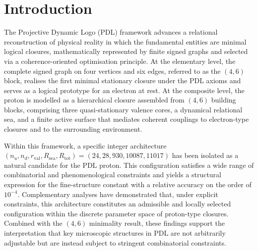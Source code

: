 \documentclass[11pt,a4paper]{article}
\theoremstyle{definition}
\newcommand{\PDL}{\mathrm{PDL}}
\begin{document}
\begin{abstract}
On this basis, we formulate a schematic scaling ansatz in which an effective gravitational coupling $G_{\mathrm{eff}}^{\PDL}$ depends on $\varepsilon$ via an exponent close to $18$, and we articulate qualitative constraints that any such dependence must satisfy in order to remain compatible with both the internal consistency of PDL and empirical phenomenology.\cite{Exponent_18_PDL_2026,Effective_Fields_PDL_2026,PDL_Global_Mapping_2026} Although we do not claim to derive the full gravitational field equations from PDL, the present analysis clarifies the interpretation of coherence leakage as a combinatorial invariant, systematises the hierarchical filtering structure, and outlines a research programme for evaluating the robustness and physical relevance of the exponent $18$.
\end{abstract}

\section{Introduction}

The Projective Dynamic Logo (PDL) framework advances a relational reconstruction of physical reality in which the fundamental entities are minimal logical closures, mathematically represented by finite signed graphs and selected via a coherence-oriented optimisation principle.\cite{PDL_Intro_2026,PDL_Main_2026,PDL_French_2026,PDL_Global_Mapping_2026} At the elementary level, the complete signed graph on four vertices and six edges, referred to as the $(4,6)$ block, realises the first minimal stationary closure under the PDL axioms and serves as a logical prototype for an electron at rest.\cite{PDL_Main_2026} At the composite level, the proton is modelled as a hierarchical closure assembled from $(4,6)$ building blocks, comprising three quasi-stationary valence cores, a dynamical relational sea, and a finite active surface that mediates coherent couplings to electron-type closures and to the surrounding environment.\cite{PDL_Main_2026,Combinatorial_Proton_v2_2026}

Within this framework, a specific integer architecture $(n_u,n_d,r_{\mathrm{val}},R_{\mathrm{sea}},R_{\mathrm{tot}})=(24,28,930,10087,11017)$ has been isolated as a natural candidate for the PDL proton. This configuration satisfies a wide range of combinatorial and phenomenological constraints and yields a structural expression for the fine-structure constant with a relative accuracy on the order of $10^{-4}$.\cite{Combinatorial_Proton_v2_2026,Alpha_PDL_v2_2026,PDL_Global_Mapping_2026} Complementary analyses have demonstrated that, under explicit constraints, this architecture constitutes an admissible and locally selected configuration within the discrete parameter space of proton-type closures.\cite{Combinatorial_Proton_v2_2026} Combined with the $(4,6)$ minimality result, these findings support the interpretation that key microscopic structures in PDL are not arbitrarily adjustable but are instead subject to stringent combinatorial constraints.
\end{document}
